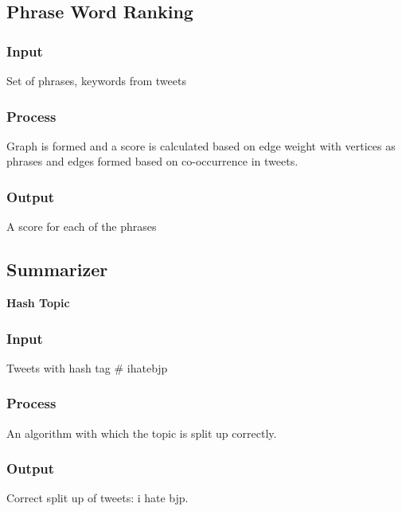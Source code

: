 \documentclass[conference]{IEEEtran}
\begin{document}
\subsection{\textbf{Phrase Word Ranking}}
\subsubsection{\textbf{Input}}
Set of phrases, keywords from tweets

\subsubsection{\textbf{Process}}
Graph is formed and a score is calculated based on edge weight with vertices as phrases and edges formed based on co-occurrence in tweets.

\subsubsection{\textbf{Output}}
A score for each of the phrases

\subsection{\textbf{Summarizer}}
\textbf{Hash Topic}
\subsubsection{\textbf{Input}}
Tweets with hash tag \# ihatebjp

\subsubsection{\textbf{Process}}
An algorithm with which the topic is split up correctly.

\subsubsection{\textbf{Output}}
Correct split up of tweets: i hate bjp.
\end{document}
